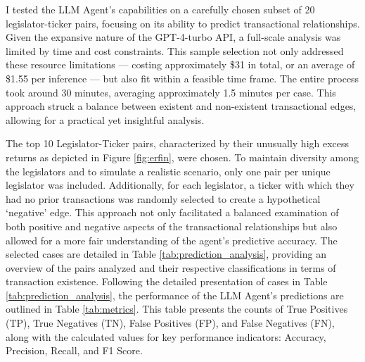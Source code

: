 \documentclass[15pt,letterpaper]{article}
\begin{document}
I tested the LLM Agent's capabilities on a carefully chosen subset of 20 legislator-ticker pairs, focusing on its ability to predict transactional relationships. Given the expansive nature of the GPT-4-turbo API, a full-scale analysis was limited by time and cost constraints. This sample selection not only addressed these resource limitations — costing approximately \$31 in total, or an average of \$1.55 per inference — but also fit within a feasible time frame. The entire process took around 30 minutes, averaging approximately 1.5 minutes per case. This approach struck a balance between existent and non-existent transactional edges, allowing for a practical yet insightful analysis.

The top 10 Legislator-Ticker 
pairs, characterized by their 
unusually high excess returns as depicted in Figure \ref{fig:erfin}, were chosen. 
To maintain diversity among the legislators and to simulate a realistic scenario, only one pair per unique legislator was included. Additionally, for each legislator, a ticker with which they had no prior transactions was randomly selected to create a hypothetical `negative' edge. 
This approach not only facilitated a balanced examination of both positive and negative aspects of the transactional relationships but also allowed for a more fair understanding of the agent's predictive accuracy.
The selected cases are detailed in Table \ref{tab:prediction_analysis}, 
providing an overview of the pairs analyzed and their respective classifications in terms of transaction existence. 
Following the detailed presentation of cases in Table \ref{tab:prediction_analysis}, the performance of the LLM Agent's predictions are outlined in Table \ref{tab:metrics}. 
This table presents the counts of True Positives (TP), True Negatives (TN), False Positives (FP), and False Negatives (FN), along with the calculated values for key performance indicators: Accuracy, Precision, Recall, and F1 Score.

\end{document}
